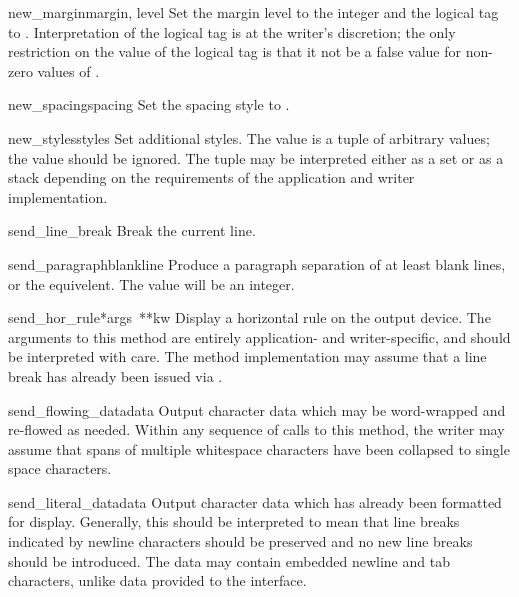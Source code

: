 \begin{funcdesc}{new_margin}{margin, level}
Set the margin level to the integer  and the logical tag
to .  Interpretation of the logical tag is at the
writer's discretion; the only restriction on the value of the logical
tag is that it not be a false value for non-zero values of
.
\end{funcdesc}

\begin{funcdesc}{new_spacing}{spacing}
Set the spacing style to .
\end{funcdesc}

\begin{funcdesc}{new_styles}{styles}
Set additional styles.  The  value is a tuple of
arbitrary values; the value  should be ignored.  The
 tuple may be interpreted either as a set or as a stack
depending on the requirements of the application and writer
implementation.
\end{funcdesc}

\begin{funcdesc}{send_line_break}{}
Break the current line.
\end{funcdesc}

\begin{funcdesc}{send_paragraph}{blankline}
Produce a paragraph separation of at least  blank
lines, or the equivelent.  The  value will be an
integer.
\end{funcdesc}

\begin{funcdesc}{send_hor_rule}{*args\, **kw}
Display a horizontal rule on the output device.  The arguments to this
method are entirely application- and writer-specific, and should be
interpreted with care.  The method implementation may assume that a
line break has already been issued via .
\end{funcdesc}

\begin{funcdesc}{send_flowing_data}{data}
Output character data which may be word-wrapped and re-flowed as
needed.  Within any sequence of calls to this method, the writer may
assume that spans of multiple whitespace characters have been
collapsed to single space characters.
\end{funcdesc}

\begin{funcdesc}{send_literal_data}{data}
Output character data which has already been formatted
for display.  Generally, this should be interpreted to mean that line
breaks indicated by newline characters should be preserved and no new
line breaks should be introduced.  The data may contain embedded
newline and tab characters, unlike data provided to the
 interface.
\end{funcdesc}

